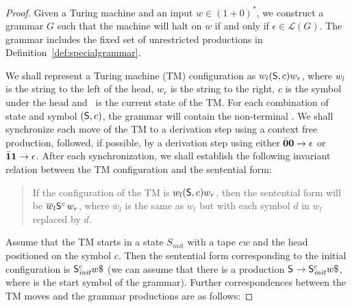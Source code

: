 \documentclass[preprint, 9pt]{sigplanconf}
\begin{document}
\begin{proof}
Given a Turing machine and  an input $w\in (1+0)^*$, we
construct a grammar $G$ such that the machine will halt
on    $w$    if    and   only    if    $\epsilon    \in
\mathscr{L}(G)$. The grammar includes  the fixed set of
unrestricted               productions               in
Definition~\ref{def:specialgrammar}.

We shall represent a Turing machine (TM) configuration 
as $w_l(\mathsf{S},c)w_r$, where $w_l$ is the string to the
left of the head, $w_r$ is the string to the right, $c$
is the symbol under the head and \state\ is the current
state of  the TM.   For each combination  of state
and symbol  $(\mathsf{S},c)$, the grammar will  contain the
non-terminal . We shall synchronize each move
of the TM to  a derivation  step using  a context
free production, followed, if possible, by a derivation
step using either  $\bar{\mathbf{0}}\mathbf{0} \rightarrow \epsilon$ or
$\bar{\mathbf{1}}\mathbf{1}   \rightarrow    \epsilon$.    After   each
synchronization,  we  shall   establish  the  following
invariant  relation between  the TM  configuration
and the sentential form:

\begin{quote}
  If    the   configuration    of   the    TM   is
  $w_l(\mathsf{S},c)w_r$, then the  sentential form will be
  $\overline{w}_l\mathsf{S}_{}^{c}\,w_r$,                where
  $\overline{w}_l$ is  the same as $w_l$  but with each
  symbol $d$ in $w_l$ replaced by $\overline{d}$.
\end{quote}

Assume that  the TM starts  in a  state $S_\mathit{init}$ with  a tape
$cw$ and  the head positioned on  the symbol $c$. Then  the sentential
form    corresponding     to    the    initial     configuration    is
$\nont{\mathit{init}}{c}w\$$ (we  can assume that there  is a production
$\nont{}{} \rightarrow  \nont{\mathit{init}}{c}w\$$, where  \nont{}{} is
the start symbol of the  grammar). Further correspondences between the
TM moves and the grammar productions are as follows:


\end{proof}
\end{document}
